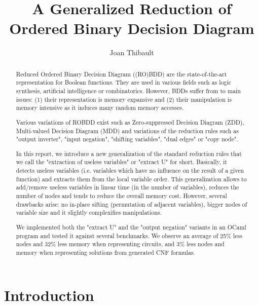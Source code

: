\documentclass[a4paper,10pt]{article}
\title{A Generalized Reduction of Ordered Binary Decision Diagram}
\author{Joan Thibault}
\begin{document}
\maketitle
\begin{abstract}
Reduced Ordered Binary Decision Diagram ((RO)BDD)\cite{Bryant1986, Somenzi1999} are the state-of-the-art representation for Boolean functions.
They are used in various fields such as logic synthesis, artificial intelligence or combinatorics.
However, BDDs suffer from to main issues: (1) their representation is memory expansive and (2) their manipulation is memory intensive as it induces many random memory accesses.


Various variations of ROBDD exist such as Zero-suppressed Decision Diagram (ZDD)\cite{IntroZDD}, Multi-valued Decision Diagram (MDD)\cite{IntroMDD, IntroMddRolf} and variations of the reduction rules such as "output inverter"\cite{BryantVariantN}, "input negation"\cite{MinatoVariants}, "shifting variables"\cite{MinatoVariants}, "dual edges"\cite{RolfVariantDual} or "copy node"\cite{RolfVariantCopy}.


In this report, we introduce a new generalization of the standard reduction rules that we call the "extraction of useless variables" or "extract U" for short.
Basically, it detects useless variables (i.e. variables which have no influence on the result of a given function) and extracts them from the local variable order.
This generalization allows to add/remove useless variables in linear time (in the number of variables), reduces the number of nodes and tends to reduce the overall memory cost.
However, several drawbacks arise: no in-place sifting (permutation of adjacent variables), bigger nodes of variable size and it slightly complexifies manipulations.


We implemented both the "extract U" and the "output negation" variants in an OCaml program and tested it against several benchmarks\cite{BenchSatlib, BenchLgsynth91, BenchIscas99}.
We observe an average of 25\% less nodes and 32\% less memory when representing circuits, and 3\% less nodes and memory when representing solutions from generated CNF formulas.
\end{abstract}


\newpage
\tableofcontents
\newpage
\newcommand{\shannon}[3]{#1 \longrightarrow_S #2, #3}
\newcommand{\B}{\mathbb{B}}%
\newcommand{\F}{\mathbb{F}}%

\section{Introduction}
\end{document}
